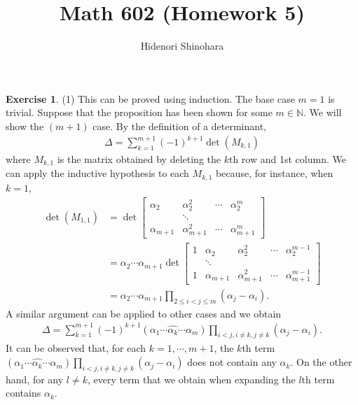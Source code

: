 \documentclass[12pt, psamsfonts]{amsart}
\theoremstyle{definition}
\newtheorem*{exer}{Exercise}
\theoremstyle{remark}
\numberwithin{equation}{section}
\begin{document}
\title{Math 602 (Homework 5)}
\author{Hidenori Shinohara}
\maketitle

\begin{exer}{(1)}
  This can be proved using induction.
  The base case $m = 1$ is trivial.
  Suppose that the proposition has been shown for some $m \in \mathbb{N}$.
  We will show the $(m + 1)$ case.
  By the definition of a determinant,
  \begin{align*}
    \Delta = \sum_{k=1}^{m + 1} (-1)^{k + 1}\det(M_{k, 1})
  \end{align*}
  where $M_{k, 1}$ is the matrix obtained by deleting the $k$th row and 1st column.
  We can apply the inductive hypothesis to each $M_{k, 1}$ because, for instance, when $k = 1$,
  \begin{align*}
    \det(M_{1, 1})
      &= \det\begin{bmatrix}
        \alpha_2 & \alpha_2^2 & \cdots & \alpha_2^m \\
        & \ddots & \\
        \alpha_{m + 1} & \alpha_{m + 1}^2 & \cdots & \alpha_{m + 1}^m
        \end{bmatrix} \\
      &= \alpha_2 \cdots \alpha_{m + 1}\det\begin{bmatrix}
        1 & \alpha_2 & \alpha_2^2 & \cdots & \alpha_2^{m - 1} \\
        & \ddots & \\
        1 & \alpha_{m + 1} & \alpha_{m + 1}^2 & \cdots & \alpha_{m + 1}^{m - 1}
        \end{bmatrix} \\
      &= \alpha_2 \cdots \alpha_{m + 1}\prod_{2 \leq i < j \leq m} (\alpha_j - \alpha_i).
  \end{align*}
  A similar argument can be applied to other cases and we obtain
  \begin{align*}
    \Delta = \sum_{k=1}^{m + 1} (-1)^{k + 1}(\alpha_1 \cdots \hat{\alpha_k} \cdots \alpha_m)\prod_{i < j, i \ne k, j \ne k} (\alpha_j - \alpha_i).
  \end{align*}
  It can be observed that, for each $k = 1, \cdots, m + 1$, the $k$th term $(\alpha_1 \cdots \hat{\alpha_k} \cdots \alpha_m)\prod_{i < j, i \ne k, j \ne k} (\alpha_j - \alpha_i)$ does not contain any $\alpha_k$.
  On the other hand, for any $l \ne k$, every term that we obtain when expanding the $l$th term contains $\alpha_k$.

\end{exer}
\end{document}
